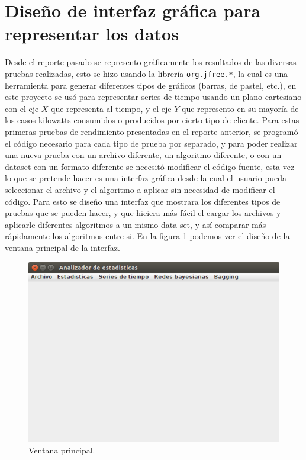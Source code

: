 \section{Diseño de interfaz gráfica para representar los datos} \label{sec:disInterfaz}
Desde el reporte pasado se represento gráficamente los resultados de las diversas pruebas realizadas, esto se hizo usando la librería \texttt{org.jfree.*}, la cual es una herramienta para generar diferentes tipos de gráficos (barras, de pastel, etc.), en este proyecto se usó para representar series de tiempo usando un plano cartesiano con el eje $X$ que representa al tiempo, y el eje $Y$ que represento en su mayoría de los casos kilowatts consumidos o producidos por cierto tipo de cliente. 
Para estas primeras pruebas de rendimiento presentadas en el reporte anterior, se programó el código necesario para cada tipo de prueba por separado, y para poder realizar una nueva prueba con un archivo diferente, un algoritmo diferente, o con un dataset con un formato diferente se necesitó modificar el código fuente, esta vez lo que se pretende hacer es una interfaz gráfica desde la cual el usuario pueda seleccionar el archivo y el algoritmo a aplicar sin necesidad de modificar el código.
Para esto se diseño una interfaz que mostrara los diferentes tipos de pruebas que se pueden hacer, y que hiciera más fácil el cargar los archivos y aplicarle diferentes algoritmos a un mismo data set, y así comparar más rápidamente los algoritmos entre si.
En la figura \ref{fig:ventanaPrincipal} podemos ver el diseño de la ventana principal de la interfaz. 
\begin{figure}[h]
	\centering
	\includegraphics[width=12cm]{img/ventanaPrincipal.png}
	\caption{Ventana principal.}
	\label{fig:ventanaPrincipal}
\end{figure}

